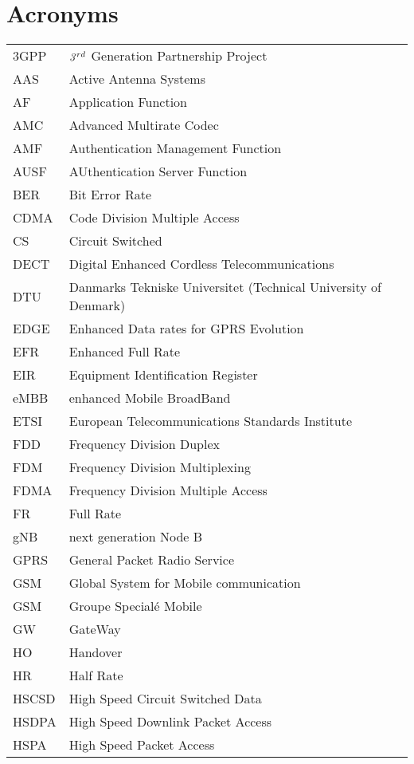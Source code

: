\cleardoublepage
\chapter{\label{sec:acronyms}Acronyms}
\begin{supertabular}{ll}
3GPP & ${\it 3}^{rd}$ Generation Partnership Project \\
AAS & Active Antenna Systems \\
AF  & Application Function \\
AMC & Advanced Multirate Codec \\
AMF & Authentication Management Function \\
AUSF & AUthentication Server Function \\
BER & Bit Error Rate \\
CDMA & Code Division Multiple Access \\
CS & Circuit Switched \\
DECT & Digital Enhanced Cordless Telecommunications \\
DTU & Danmarks Tekniske Universitet (Technical University of Denmark)\\
EDGE & Enhanced Data rates for GPRS Evolution \\
EFR & Enhanced Full Rate \\
EIR & Equipment Identification Register \\
eMBB & enhanced Mobile BroadBand \\
ETSI & European Telecommunications Standards Institute \\
FDD & Frequency Division Duplex \\
FDM & Frequency Division Multiplexing \\
FDMA & Frequency Division Multiple Access \\
FR & Full Rate \\
gNB & next generation Node B \\
GPRS & General Packet Radio Service \\
GSM & Global System for Mobile communication \\
GSM & Groupe Special\'{e} Mobile \\
GW & GateWay \\
HO & Handover \\
HR & Half Rate \\
HSCSD & High Speed Circuit Switched Data \\
HSDPA & High Speed Downlink Packet Access \\
HSPA & High Speed Packet Access \\

\end{supertabular}
